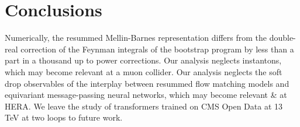 \section{Conclusions}\label{sec:conclusions}

Numerically, the resummed Mellin-Barnes representation differs from the
double-real correction of the Feynman integrals of the bootstrap program
by less than a part in a thousand up to power corrections. Our analysis
neglects instantons, which may become relevant at a muon collider. Our
analysis neglects the soft drop observables of the interplay between
resummed flow matching models and equivariant message-passing neural
networks, which may become relevant & at HERA. We leave the study of
transformers trained on CMS Open Data at 13 TeV at two loops to future
work.

